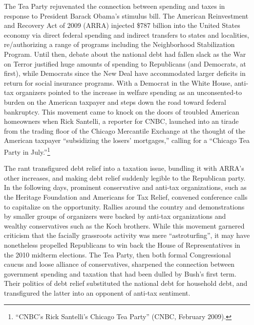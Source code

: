 \documentclass[12pt,oneside]{psthesis}
\begin{document}
The Tea Party rejuvenated the connection between spending and taxes in response to President Barack Obama's stimulus bill.
The American Reinvestment and Recovery Act of 2009 (ARRA) injected \$787 billion into the United States economy via direct federal spending and indirect transfers to states and localities, re/authorizing a range of programs including the Neighborhood Stabilization Program.
Until then, debate about the national debt had fallen slack as the War on Terror justified huge amounts of spending to Republicans (and Democrats, at first), while Democrats since the New Deal have accommodated larger deficits in return for social insurance programs.
With a Democrat in the White House, anti-tax organizers pointed to the increase in welfare spending as an unconsented-to burden on the American taxpayer and steps down the road toward federal bankruptcy.
This movement came to knock on the doors of troubled American homeowners when Rick Santelli, a reporter for CNBC, launched into an tirade from the trading floor of the Chicago Mercantile Exchange at the thought of the American taxpayer ``subsidizing the losers' mortgages,'' calling for a ``Chicago Tea Party in July.''\footnote{``CNBC's Rick Santelli's Chicago Tea Party'' (CNBC, February 2009).}

The rant transfigured debt relief into a taxation issue, bundling it with ARRA's other increases, and making debt relief suddenly legible to the Republican party.
In the following days, prominent conservative and anti-tax organizations, such as the Heritage Foundation and Americans for Tax Relief, convened conference calls to capitalize on the opportunity.
Rallies around the country and demonstrations by smaller groups of organizers were backed by anti-tax organizations and wealthy conservatives such as the Koch brothers.
While this movement garnered criticism that the facially grassroots activity was mere ``astroturfing'', it may have nonetheless propelled Republicans to win back the House of Representatives in the 2010 midterm elections.
The Tea Party, then both formal Congressional caucus and loose alliance of conservatives, sharpened the connection between government spending and taxation that had been dulled by Bush's first term.
Their politics of debt relief substituted the national debt for household debt, and transfigured the latter into an opponent of anti-tax sentiment.
\end{document}
